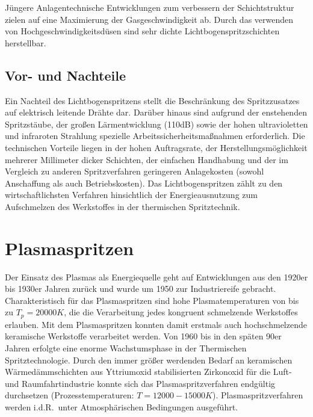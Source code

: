 \documentclass[12pt,a4paper,bibliography=totocnumbered,listof=totocnumbered,fleqn]{scrartcl}
\begin{document}
Jüngere Anlagentechnische Entwicklungen zum verbessern der Schichtstruktur zielen auf eine Maximierung der Gasgeschwindigkeit ab.
Durch das verwenden von Hochgeschwindigkeitsdüsen sind sehr dichte Lichtbogenspritzschichten herstellbar.
\pagebreak

\subsection{Vor- und Nachteile}

Ein Nachteil des Lichtbogenspritzens stellt die Beschränkung des Spritzzusatzes auf elektrisch leitende Drähte dar.
Darüber hinaus sind aufgrund der enstehenden Spritzstäube, der großen Lärmentwicklung (110dB) sowie der hohen ultravioletten und infraroten Strahlung spezielle Arbeitssicherheitsmaßnahmen erforderlich.
Die technischen Vorteile liegen in der hohen Auftragsrate, der Herstellungsmöglichkeit mehrerer Millimeter dicker Schichten, der einfachen Handhabung und der im Vergleich zu anderen Spritzverfahren geringeren Anlagekosten (sowohl Anschaffung als auch Betriebskosten).
Das Lichtbogenspritzen zählt zu den wirtschaftlichsten Verfahren hinsichtlich der Energieausnutzung zum Aufschmelzen des Werkstoffes in der thermischen Spritztechnik.

\pagebreak
\section{Plasmaspritzen}

Der Einsatz des Plasmas als Energiequelle geht auf Entwicklungen aus den 1920er bis 1930er Jahren zurück und wurde um 1950 zur Industriereife gebracht.
Charakteristisch für das Plasmaspritzen sind hohe Plasmatemperaturen von bis zu $T_{p}=20000K$, die die Verarbeitung jedes kongruent schmelzende Werkstoffes erlauben.
Mit dem Plasmaspritzen konnten damit erstmals auch hochschmelzende keramische Werkstoffe verarbeitet werden.
Von 1960 bis in den späten 90er Jahren erfolgte eine enorme Wachstumsphase in der Thermischen Spritztechnologie.
Durch den immer größer werdenden Bedarf an keramischen Wärmedämmschichten aus Yttriumoxid stabilisierten Zirkonoxid für die Luft- und Raumfahrtindustrie konnte sich das Plasmaspritzverfahren endgültig durchsetzen (Prozesstemperaturen: $T=12000-15000K$).
Plasmaspritzverfahren werden i.d.R.\ unter Atmosphärischen Bedingungen ausgeführt.
\end{document}
